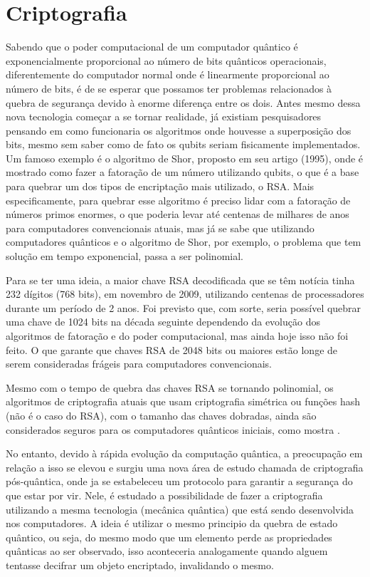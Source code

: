 \documentclass[
	12pt,				%
	oneside,			%
	a4paper,			%
	english,			%
	french,				%
	spanish,			%
	brazil,				%
	]{abntex2}
\begin{document}
\chapter{Criptografia}

Sabendo que o poder computacional de um computador quântico é exponencialmente proporcional ao número de bits quânticos operacionais, diferentemente do computador normal onde é linearmente proporcional ao número de bits, é de se esperar que possamos ter problemas relacionados à quebra de segurança devido à enorme diferença entre os dois. Antes mesmo dessa nova tecnologia começar a se tornar realidade, já existiam pesquisadores pensando em como funcionaria os algoritmos onde houvesse a superposição dos bits, mesmo sem saber como de fato os qubits seriam fisicamente implementados. Um famoso exemplo é o algoritmo de Shor, proposto em seu artigo (1995), onde é mostrado como fazer a fatoração de um número utilizando qubits, o que é a base para quebrar um dos tipos de encriptação mais utilizado, o RSA. Mais especificamente, para quebrar esse algoritmo é preciso lidar com a fatoração de números primos enormes, o que poderia levar até centenas de milhares de anos para computadores convencionais atuais, mas já se sabe que utilizando computadores quânticos e o algoritmo de Shor, por exemplo, o problema que tem solução em tempo exponencial, passa a ser polinomial.

Para se ter uma ideia, a maior chave RSA decodificada que se têm notícia tinha 232 dígitos (768 bits), em novembro de 2009, utilizando centenas de processadores durante um período de 2 anos. Foi previsto que, com sorte, seria possível quebrar uma chave de 1024 bits na década seguinte dependendo da evolução dos algoritmos de fatoração e do poder computacional, mas ainda hoje isso não foi feito. O que garante que chaves RSA de 2048 bits ou maiores estão longe de serem consideradas frágeis para computadores convencionais.

Mesmo com o tempo de quebra das chaves RSA se tornando polinomial, os algoritmos de criptografia atuais que usam criptografia simétrica ou funções hash (não é o caso do RSA), com o tamanho das chaves dobradas, ainda são considerados seguros para os computadores quânticos iniciais, como mostra \cite{bernstein2017}. 

No entanto, devido à rápida evolução da computação quântica, a preocupação em relação a isso se elevou e surgiu uma nova área de estudo chamada de criptografia pós-quântica, onde ja se estabeleceu um protocolo para garantir a segurança do que estar por vir. Nele, é estudado a possibilidade de fazer a criptografia utilizando a mesma tecnologia (mecânica quântica) que está sendo desenvolvida nos computadores. A ideia é utilizar o mesmo principio da quebra de estado quântico, ou seja, do mesmo modo que um elemento perde as propriedades quânticas ao ser observado, isso aconteceria analogamente quando alguem tentasse decifrar um objeto encriptado, invalidando o mesmo.
\end{document}
